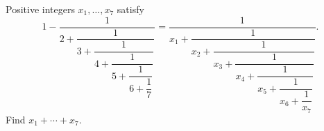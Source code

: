 Positive integers $x_1,\ldots,x_7$ satisfy
\[1-\dfrac{1}{2+\dfrac{1}{3+\dfrac{1}{4+\dfrac{1}{5+\dfrac{1}{6+\dfrac{1}{7}}}}}}=\dfrac{1}{x_1+\dfrac{1}{x_2+\dfrac{1}{x_3+\dfrac{1}{x_4+\dfrac{1}{x_5+\dfrac{1}{x_6+\dfrac{1}{x_7}}}}}}}.\]
Find $x_1+\cdots+x_7$.
